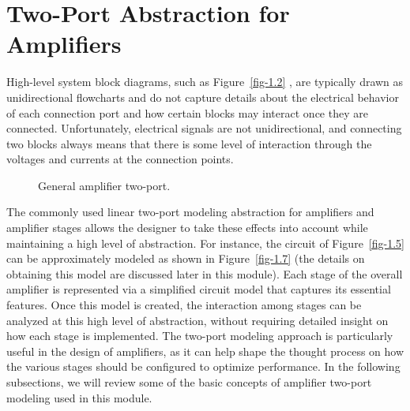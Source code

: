 \documentclass[
  11pt,
  letterpaper,
  abstract]{scrbook}
\begin{document}
\section{Two-Port Abstraction for
Amplifiers}\label{two-port-abstraction-for-amplifiers}

High-level system block diagrams, such as Figure~\ref{fig-1.2} , are
typically drawn as unidirectional flowcharts and do not capture details
about the electrical behavior of each connection port and how certain
blocks may interact once they are connected. Unfortunately, electrical
signals are not unidirectional, and connecting two blocks always means
that there is some level of interaction through the voltages and
currents at the connection points.

\begin{figure}


\caption{\label{fig-1.8}General amplifier two-port.}

\end{figure}%

The commonly used linear two-port modeling abstraction for amplifiers
and amplifier stages allows the designer to take these effects into
account while maintaining a high level of abstraction. For instance, the
circuit of Figure~\ref{fig-1.5} can be approximately modeled as shown in
Figure~\ref{fig-1.7} (the details on obtaining this model are discussed
later in this module). Each stage of the overall amplifier is
represented via a simplified circuit model that captures its essential
features. Once this model is created, the interaction among stages can
be analyzed at this high level of abstraction, without requiring
detailed insight on how each stage is implemented. The two-port modeling
approach is particularly useful in the design of amplifiers, as it can
help shape the thought process on how the various stages should be
configured to optimize performance. In the following subsections, we
will review some of the basic concepts of amplifier two-port modeling
used in this module.
\end{document}
